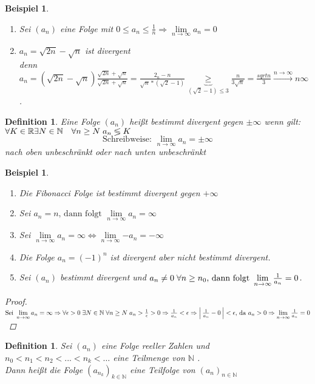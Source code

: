 \documentclass[a4paper,titlepage,oneside]{article}
\def\N{\ensuremath{\mathbb{N}} }
\def\R{\ensuremath{\mathbb{R}} }
\def\sp{\hspace{0,1cm}}
\renewcommand{\liminf}[2][n]{\ensuremath{\lim\limits_{#1 \rightarrow \infty}{#2}}}
\newcommand{\abs}[1]{\ensuremath{\left|\:#1\:\right|}}
\newcommand{\longtoinf}[1][n]{\ensuremath{\overset{\scriptscriptstyle{#1 \to \infty}}{\longrightarrow}}}
\theoremstyle{thmstyle}
\newtheorem{defi}[satz]{Definition}
\newtheorem{bsp}[satz]{Beispiel}
\begin{document}
\begin{bsp}
\begin{enumerate}
\item Sei \((a_n)\) eine Folge mit \(0 \le a_n \le \frac{1}{n} \Rightarrow \liminf{a_n} = 0\)
\item \(a_n = \sqrt{2n} - \sqrt{n}\) ist divergent\\
denn \(a_n = \left(\sqrt{2n} - \sqrt{n}\right)\frac{\sqrt{2n} + \sqrt{n}}{\sqrt{2n} + \sqrt{n}} = \frac{2_n - n}{\sqrt{n}*\left(\sqrt{2} - 1\right)} \underbrace{\ge}_{\left(\sqrt{2} - 1\right)\le 3} \frac{n}{3\sqrt{n}} = \frac{sqrt{n}}{3} \longtoinf{n} \infty\).
\end{enumerate}
\end{bsp}

\begin{defi}
Eine Folge \((a_n)\) heißt bestimmt divergent gegen \(\pm \infty \) wenn gilt: \(\forall K \in \R \exists N \in \N \quad \forall n \ge N \sp a_n \lessgtr K \)
\[\text{Schreibweise: }\liminf{a_n} = \pm \infty \]
nach oben unbeschränkt oder nach unten unbeschränkt
\end{defi}

\begin{bsp}
\begin{enumerate}
\item Die Fibonacci Folge ist bestimmt divergent gegen \(+ \infty\)
\item Sei \(a_n = n\text{, dann folgt }\liminf{a_n} = \infty\)
\item Sei \(\liminf{a_n} = \infty \Leftrightarrow \liminf{-a_n} = - \infty\)
\item Die Folge \(a_n = (-1)^n\) ist divergent aber nicht bestimmt divergent.
\item Sei \((a_n)\) bestimmt divergent und \(a_n \ne 0 \sp \forall n \ge n_0\text{, dann folgt }\liminf{\frac{1}{a_n}} = 0\).
\end{enumerate}
\begin{proof}
\(\text{Sei } \liminf{a_n} = \infty \Rightarrow \forall \epsilon > 0 \sp \exists N \in \N \sp \forall n \ge N \sp a_n > \frac{1}{\epsilon} > 0 \Rightarrow \frac{1}{a_n} < \epsilon \Rightarrow \abs{\frac{1}{a_n} - 0} < \epsilon \text{, da } a_n > 0 \Rightarrow \liminf{\frac{1}{a_n}} = 0\)
\end{proof}
\end{bsp}

\begin{defi}
Sei \((a_n)\) eine Folge reeller Zahlen und \(n_0 < n_1 < n_2 <... < n_k < \dots \) eine Teilmenge von \N.\\
Dann heißt die Folge \((a_{n_k})_{k \in \N }\) eine Teilfolge von \((a_n)_{n \in \N}\)
\end{defi}
\end{document}
